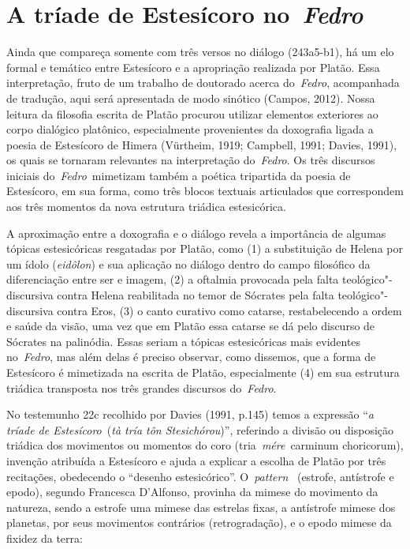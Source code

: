  

\section{A tríade de Estesícoro no~\emph{Fedro}}

 

Ainda que compareça somente com três versos no diálogo (243a5-b1), há um
elo formal e temático entre Estesícoro e a apropriação realizada por
Platão. Essa interpretação, fruto de um trabalho de doutorado acerca
do~\emph{Fedro}, acompanhada de tradução, aqui será apresentada de modo
sinótico (Campos, 2012). Nossa leitura da filosofia escrita de Platão
procurou utilizar elementos exteriores ao corpo dialógico platônico,
especialmente provenientes da doxografia ligada a poesia de Estesícoro
de Himera (Vürtheim, 1919; Campbell, 1991; Davies, 1991), os quais se
tornaram relevantes na interpretação do~\emph{Fedro}. Os três discursos
iniciais do~\emph{Fedro}~mimetizam também a poética tripartida da poesia
de Estesícoro, em sua forma, como três blocos textuais articulados que
correspondem aos três momentos da nova estrutura triádica estesicórica.

A aproximação entre a doxografia e o diálogo revela a importância de
algumas tópicas estesicóricas resgatadas por Platão, como (1) a
substituição de Helena por um ídolo (\emph{eidôlon}) e sua aplicação no
diálogo dentro do campo filosófico da diferenciação entre ser e imagem,
(2) a oftalmia provocada pela falta teológico"-discursiva contra Helena
reabilitada no temor de Sócrates pela falta teológico"-discursiva contra
Eros, (3) o canto curativo como catarse, restabelecendo a ordem e saúde
da visão, uma vez que em Platão essa catarse se dá pelo discurso de
Sócrates na palinódia. Essas seriam a tópicas estesicóricas mais
evidentes no~\emph{Fedro}, mas além delas é preciso observar, como
dissemos, que a forma de Estesícoro é mimetizada na escrita de Platão,
especialmente (4) em sua estrutura triádica transposta nos três grandes
discursos do~\emph{Fedro}.

No testemunho 22c recolhido por Davies (1991, p.145) temos a expressão
``\emph{a tríade de Estesícoro}~(\emph{tà tría tôn Stesichórou})'',
referindo a divisão ou disposição triádica dos movimentos ou momentos do
coro (tria~\emph{mére}~carminum choricorum), invenção atribuída a
Estesícoro e ajuda a explicar a escolha de Platão por três recitações,
obedecendo o ``desenho estesicórico''. O~\emph{pattern}~ (estrofe,
antístrofe e epodo), segundo Francesca D'Alfonso, provinha da mimese do
movimento da natureza, sendo a estrofe uma mimese das estrelas fixas, a
antístrofe mimese dos planetas, por seus movimentos contrários
(retrogradação), e o epodo mimese da fixidez da terra:

